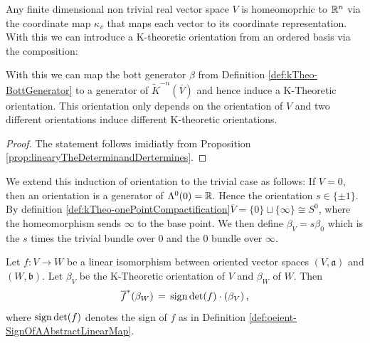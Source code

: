 \begin{corollary}\label{cor:orient-vectorspaceOrientationInducesKtheoreticOrientation}
Any finite dimensional non trivial real vector space $V$ is homeomoprhic to $\mathbb{R}^n$ via the coordinate map $\kappa_v$ that maps each vector to its coordinate representation. With this we can introduce a K-theoretic orientation from an ordered basis via the composition: 
   \begin{center}
   \end{center} With this we can map the bott generator $\beta$ from Definition \ref{def:kTheo-BottGenerator} to a generator of $\tilde{K}^{-n}(\overline{V})$ and hence induce a K-Theoretic orientation. This orientation only depends on the orientation of $V$ and two different orientations induce different K-theoretic orientations.
\end{corollary}
\begin{proof}
    The statement follows imidiatly from Proposition \ref{prop:linearyTheDeterminandDertermines}.
\end{proof}
\begin{corollary} \label{def:orient-InducedOrientationTrivialVectorspace}
    We extend this induction of orientation to the trivial case as follows: If $V=0$, then an orientation is a generator of $\Lambda^0(0)=\mathbb{R}$. Hence the orientation $s\in \{\pm 1\}$. By definition \ref{def:kTheo-onePointCompactification}$\overline{V}=\{0\}\sqcup\{\infty\}\cong S^0$, where the homeomorphism sends $\infty$ to the base point. We then define $\beta_{V}=s\beta_0$ which is the $s$ times the trivial bundle over $0$ and the $0$ bundle over $\infty$.   
\end{corollary}
\begin{corollary}\label{cor:orient-mapsbetweenabstractVectorSpacesOnKOrientations}
    Let $f:V\to W$ be a linear isomorphism between oriented vector spaces $(V,\mathfrak{a})$ and $(W,\mathfrak{b})$. Let $\beta_V$ be the K-Theoretic orientation of $V$ and $\beta_W$ of $W$. Then 
    \begin{equation*}
       \overline{f}^*(\beta_W)\,=\, \mathrm{sign} \det(f)\cdot (\beta _V)\,,
    \end{equation*} where $\mathrm{sign} \det (f)$ denotes the sign of $f$ as in Definition \ref{def:oeient-SignOfAAbstractLinearMap}.
\end{corollary}
